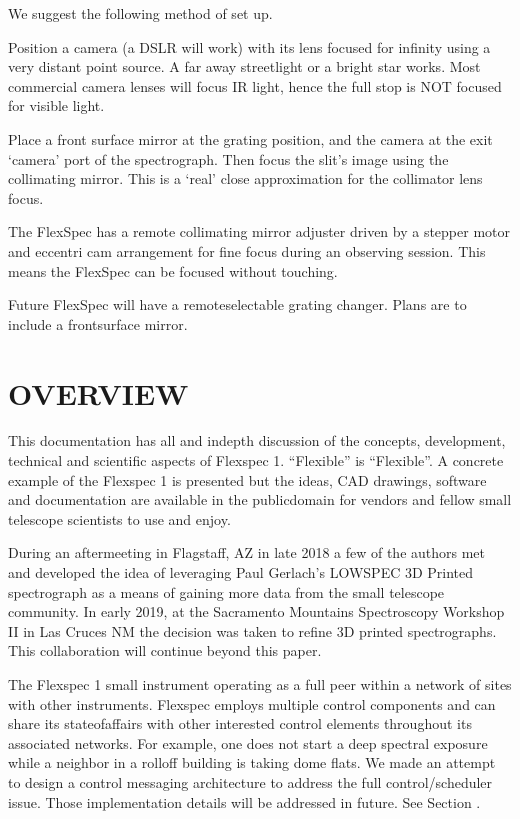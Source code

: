 \documentclass[letterpaper,10pt,english,openany,oneside]{sphinxmanual}
\begin{document}
\sphinxAtStartPar
We suggest the following method of set up.

\sphinxAtStartPar
Position a camera (a DSLR will work) with its lens focused for
infinity using a very distant point source. A far away
street\sphinxhyphen{}light or a bright star works. Most commercial camera
lenses will focus IR light, hence the full stop is NOT
focused for visible light.

\sphinxAtStartPar
Place a front surface mirror at the grating position, and the camera
at the exit ‘camera’ port of the spectrograph. Then focus the slit’s
image using the collimating mirror. This is a ‘real’ close
approximation for the collimator lens focus.

\sphinxAtStartPar
The FlexSpec has a remote collimating mirror adjuster driven by
a stepper motor and eccentri cam arrangement for fine focus during
an observing session.  This means the FlexSpec can be focused
without touching.

\sphinxAtStartPar
Future FlexSpec will have a remote\sphinxhyphen{}selectable grating changer. Plans
are to include a front\sphinxhyphen{}surface mirror.


\chapter{OVERVIEW}
\label{\detokenize{overview:overview}}\label{\detokenize{overview::doc}}
\sphinxAtStartPar
This documentation has all {\hyperref[\detokenize{bom:flexspec1-bom}]{}} and in\sphinxhyphen{}depth discussion of
the concepts, development, technical and scientific aspects of
Flexspec 1. “Flexible” is “Flexible”. A concrete example
of the Flexspec 1 is presented but the ideas, CAD drawings,
software and documentation are available in the public\sphinxhyphen{}domain
for vendors and fellow small telescope scientists to use and
enjoy.

\sphinxAtStartPar
During an after\sphinxhyphen{}meeting in Flagstaff, AZ in late 2018 a few of the
authors met and developed the idea of leveraging Paul Gerlach’s
LOWSPEC 3D Printed spectrograph as a means of gaining more data from
the small telescope community. In early 2019, at the Sacramento
Mountains Spectroscopy Workshop II in Las Cruces NM the decision was
taken to refine 3D printed spectrographs. This collaboration will
continue beyond this paper.

\sphinxAtStartPar
The Flexspec 1 small instrument operating as a full peer within a
network of sites with other instruments.  Flexspec employs multiple
control components and can share its state\sphinxhyphen{}of\sphinxhyphen{}affairs with other
interested control elements throughout its associated networks. For
example, one does not start a deep spectral exposure while a neighbor
in a roll\sphinxhyphen{}off building is taking dome flats. We made an attempt to
design a control messaging architecture to address the full
control/scheduler issue. Those implementation details will be
addressed in future. See Section {\hyperref[\detokenize{controls:fs1-control}]{}}.
\end{document}
